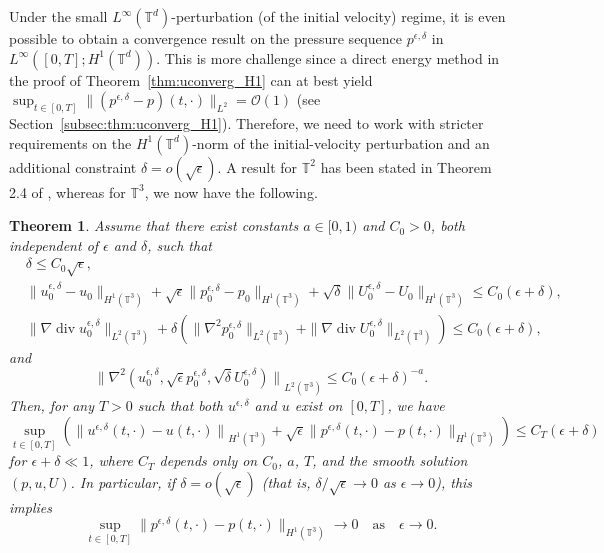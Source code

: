 \documentclass[reqno,10pt]{amsart}
\newtheorem{theorem}{Theorem}[section]
\theoremstyle{definition}
\theoremstyle{remark}
\numberwithin{equation}{section}
\DeclareMathOperator{\dive}{div}
\begin{document}
Under the small $L^\infty(\mathbb T^d)$-perturbation (of the initial velocity) regime, it is even possible to obtain a convergence result on the pressure sequence $p^{\epsilon,\delta}$ in $L^\infty([0,T];H^1(\mathbb T^d))$. This is more challenge since a direct energy method in the proof of Theorem~\ref{thm:uconverg_H1} can at best yield $\sup_{t\in[0,T]}\| (p^{\epsilon,\delta}-p)(t,\cdot) \|_{L^2}=\mathcal O(1)$ (see Section~\ref{subsec:thm:uconverg_H1}). Therefore, we need to work with stricter requirements on the $H^1(\mathbb T^d)$-norm of the initial-velocity perturbation and an additional constraint 
$\delta=o(\sqrt\epsilon)$. A result for $\mathbb T^2$ has been stated in Theorem 2.4 of \cite{HRYZ25}, whereas for $\mathbb T^3$, we now have the following.

\begin{theorem} \label{thm:pressure_3d} 
Assume that there exist constants $a\in [0,1)$ and $C_0>0$, both independent of $\epsilon$ and $\delta$, such that
    \begin{align}
        & \delta \le C_0\sqrt\epsilon, \label{eq:p_scaling} \\
        &\| u^{\epsilon,\delta}_0 - u_0\|_{H^1(\mathbb T^3)} + \sqrt\epsilon \|p^{\epsilon,\delta}_0 - p_0\|_{H^1(\mathbb T^3)}+ \sqrt\delta \|U^{\epsilon,\delta}_0 - U_0\|_{H^1(\mathbb T^3)} \le C_0(\epsilon+\delta), \label{eq:3dp_assump_1} \\
        &\|\nabla \dive u^{\epsilon,\delta}_0\|_{L^2(\mathbb T^3)} + \delta \left(\| \nabla^2 p^{\epsilon,\delta}_0\|_{L^2(\mathbb T^3)} + \|\nabla \dive U^{\epsilon,\delta}_0\|_{L^2(\mathbb T^3)} \right) \le C_0(\epsilon+\delta), \label{eq:3dp_assump_2} 
    \end{align}
    and
    \begin{equation} \label{eq:3dp_assump_3}
        {\|\nabla^2(u^{\epsilon,\delta}_0, \sqrt\epsilon p^{\epsilon,\delta}_0, \sqrt\delta U^{\epsilon,\delta}_0)\|}_{L^2(\mathbb T^3)} \le C_0(\epsilon+\delta)^{-a}.
    \end{equation}
    Then, for any $T>0$ such that both $u^{\epsilon,\delta}$ and $u$ exist on $[0,T]$, we have
    \[
        \sup_{t\in[0,T]} \left( {\| u^{\epsilon,\delta}(t,\cdot)-u(t,\cdot)\|}_{H^1(\mathbb T^3)} + \sqrt\epsilon \|p^{\epsilon,\delta}(t,\cdot)-p(t,\cdot)\|_{H^1(\mathbb T^3)} \right) \le C_T(\epsilon+\delta)
    \]
    for $\epsilon+\delta\ll 1$, where $C_T$ depends only on $C_0$, $a$, $T$, and the smooth solution $(p,u,U)$. In particular, if $\delta=o(\sqrt\epsilon)$ (that is, $\delta/\sqrt\epsilon \to 0$ as $\epsilon\to 0$), 
    this implies
    \[ 
        \sup_{t\in[0,T]} \|p^{\epsilon,\delta}(t,\cdot)-p(t,\cdot)\|_{H^1(\mathbb T^3)} \to 0 \quad \text{as} \quad \epsilon\to 0.
    \]
\end{theorem}
\end{document}
